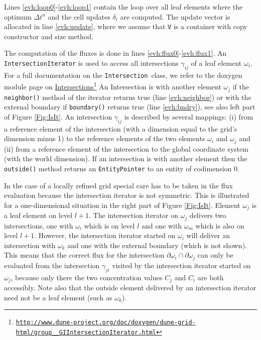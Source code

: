 \documentclass[11pt,a4paper,headinclude,footinclude,DIV16,normalheadings]{scrreprt}
\begin{document}
Lines \ref{evh:loop0}-\ref{evh:loop1} contain the loop over all leaf
elements where the optimum $\Delta t^n$ and the cell updates
$\delta_i$ are computed. The update vector is allocated in line
\ref{evh:update}, where we assume that \lstinline!V! is a container
with copy constructor and size method.

The computation of the fluxes is done in lines
\ref{evh:flux0}-\ref{evh:flux1}. An \lstinline!IntersectionIterator!
is used to access all intersections $\gamma_{ij}$ of a leaf element
$\omega_i$. For a full documentation on the
\lstinline!Intersection!\ class, we refer to the doxygen module page on 
\href{http://www.dune-project.org/doc/doxygen/dune-grid-html/group\_\_GIIntersectionIterator.html}{Intersections}\footnote{\href{http://www.dune-project.org/doc/doxygen/dune-grid-html/group\_\_GIIntersectionIterator.html}
{{\small\texttt{http://www.dune-project.org/doc/doxygen/dune-grid-html/group\_\_GIIntersectionIterator.html}}}}
An Intersection is with another element $\omega_j$ if the
\lstinline!neighbor()! method of the iterator returns true (line
\ref{evh:neighbor}) or with the external boundary if
\lstinline!boundary()! returns true (line \ref{evh:bndry}), see also
left part of Figure \ref{Fig:IsIt}. An intersection $\gamma_{ij}$ is
described by several mappings: (i) from a reference element of the
intersection (with a dimension equal to the grid's dimension minus 1)
to the reference elements of the two elements $\omega_i$ and
$\omega_j$ and (ii) from a reference element of the intersection to
the global coordinate system (with the world dimension). If an
intersection is with another element then the \lstinline!outside()!
method returns an \lstinline!EntityPointer! to an entity of
codimension 0.

In the case of a locally refined grid special care has to be taken in
the flux evaluation because the intersection iterator is not
symmetric. This is illustrated for a one-dimensional situation in
the right part of Figure \ref{Fig:IsIt}. Element
$\omega_j$ is a leaf element on level $l+1$. The intersection iterator
on $\omega_j$ delivers two intersections, one with $\omega_i$ which is
on level $l$ and one with $\omega_m$ which is also on level
$l+1$. However, the intersection iterator started on $\omega_i$ will
deliver an intersection with $\omega_k$ and one with the external
boundary (which is not shown). This means that the correct flux for
the intersection $\partial\omega_i\cap\partial\omega_j$ can only be
evaluated from the intersection $\gamma_{ji}$ visited by the
intersection iterator started on $\omega_j$, because only there the
two concentration values $C_j$ and $C_i$ are both accessibly. Note
also that the outside element delivered by an intersection
iterator need not be a leaf element (such as $\omega_k$). 
\end{document}
